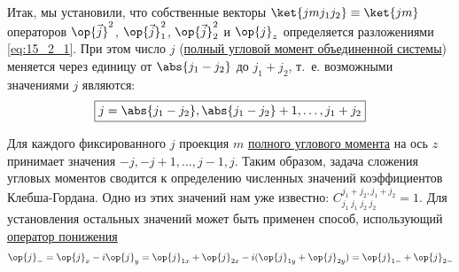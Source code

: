 Итак, мы установили, что собственные векторы $\ket{j m j_1 j_2} \equiv \ket{j m}$ операторов $\op{\vec{j}}^2$, $\op{\vec{j}}_1^2$, $\op{\vec{j}}_2^2$ и $\op{j}_z$ определяется разложениями \eqref{eq:15_2_1}. При этом число $j$ (\underline{полный угловой момент объединенной системы}) меняется через единицу от $\abs{j_1 - j_2}$ до $j_1 + j_2$, т.~е. возможными значениями $j$ являются:
\begin{equation}
\label{eq:15_2_4}
\boxed{j = \abs{j_1 - j_2}, \abs{j_1 - j_2} + 1, \dots, j_1 + j_2}
\end{equation}

Для каждого фиксированного $j$ проекция $m$ \underline{полного углового момента} на ось $z$ принимает значения $-j, -j + 1, \dots, j -1, j$. Таким образом, задача сложения угловых моментов сводится к определению численных значений коэффициентов Клебша-Гордана. Одно из этих значений нам уже известно: $C^{j_1+j_2, j_1 + j_2}_{j_1~j_1~j_2~j_2} = 1$. Для установления остальных значений может быть применен способ, использующий \underline{оператор понижения}
\begin{gather*}
\op{j}_- = \op{j}_x - i \op{j}_y = \op{j}_{1x} + \op{j}_{2x} - i (\op{j}_{1y} + \op{j}_{2y}) = \op{j}_{1-} + \op{j}_{2-}
\end{gather*}